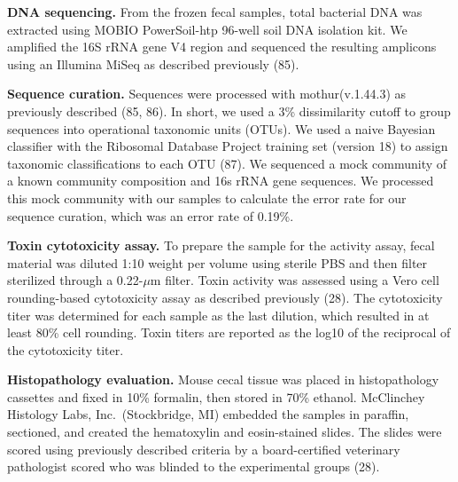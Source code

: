 \documentclass[
  12pt,
]{article}
\begin{document}
\textbf{DNA sequencing.} From the frozen fecal samples, total bacterial
DNA was extracted using MOBIO PowerSoil-htp 96-well soil DNA isolation
kit. We amplified the 16S rRNA gene V4 region and sequenced the
resulting amplicons using an Illumina MiSeq as described previously
(85).

\textbf{Sequence curation.} Sequences were processed with
mothur(v.1.44.3) as previously described (85, 86). In short, we used a
3\% dissimilarity cutoff to group sequences into operational taxonomic
units (OTUs). We used a naive Bayesian classifier with the Ribosomal
Database Project training set (version 18) to assign taxonomic
classifications to each OTU (87). We sequenced a mock community of a
known community composition and 16s rRNA gene sequences. We processed
this mock community with our samples to calculate the error rate for our
sequence curation, which was an error rate of 0.19\%.

\textbf{Toxin cytotoxicity assay.} To prepare the sample for the
activity assay, fecal material was diluted 1:10 weight per volume using
sterile PBS and then filter sterilized through a 0.22-\(\mu\)m filter.
Toxin activity was assessed using a Vero cell rounding-based
cytotoxicity assay as described previously (28). The cytotoxicity titer
was determined for each sample as the last dilution, which resulted in
at least 80\% cell rounding. Toxin titers are reported as the log10 of
the reciprocal of the cytotoxicity titer.

\textbf{Histopathology evaluation.} Mouse cecal tissue was placed in
histopathology cassettes and fixed in 10\% formalin, then stored in 70\%
ethanol. McClinchey Histology Labs, Inc.~(Stockbridge, MI) embedded the
samples in paraffin, sectioned, and created the hematoxylin and
eosin-stained slides. The slides were scored using previously described
criteria by a board-certified veterinary pathologist scored who was
blinded to the experimental groups (28).
\end{document}
